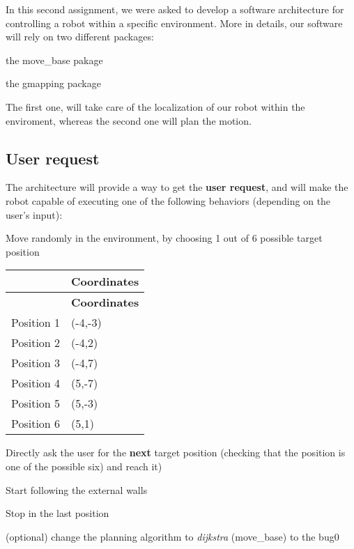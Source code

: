 In this second assignment, we were asked to develop a software architecture for controlling a robot within a specific environment. More in details, our software will rely on two different packages\+:


\begin{DoxyEnumerate}
\item the move\+\_\+base pakage
\item the gmapping package
\end{DoxyEnumerate}

The first one, will take care of the localization of our robot within the enviroment, whereas the second one will plan the motion.

\subsection*{User request}

The architecture will provide a way to get the {\bfseries user request}, and will make the robot capable of executing one of the following behaviors (depending on the user’s input)\+:


\begin{DoxyEnumerate}
\item Move randomly in the environment, by choosing 1 out of 6 possible target position \tabulinesep=1mm
\begin{longtabu} spread 0pt [c]{*2{|X[-1]}|}
\hline
{}&{\bf Coordinates  }\\
\endfirsthead
\hline
\endfoot
\hline
{}&{\bf Coordinates  }\\
\endhead
Position 1 &(-\/4,-\/3) \\
Position 2 &(-\/4,2) \\
Position 3 &(-\/4,7) \\
Position 4 &(5,-\/7) \\
Position 5 &(5,-\/3) \\
Position 6 &(5,1) \\
\end{longtabu}

\item Directly ask the user for the {\bfseries next} target position (checking that the position is one of the possible six) and reach it)
\item Start following the external walls
\item Stop in the last position
\item (optional) change the planning algorithm to {\itshape dijkstra} (move\+\_\+base) to the {\ttfamily bug0}
\end{DoxyEnumerate}

